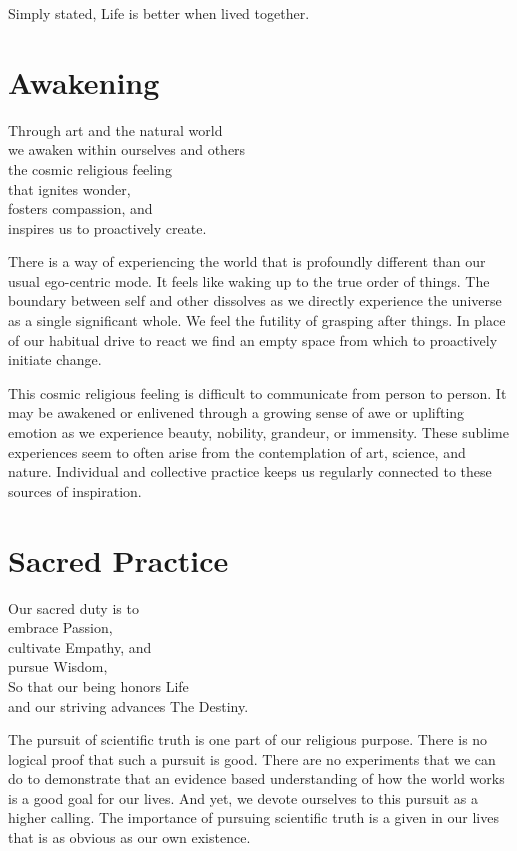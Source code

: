 \documentclass[ebook,12pt,openany,twoside]{memoir}
\newcommand{\tab}{\hspace*{2em}}
\newcommand{\imagefacingchapter}[1]{
  \cleartoverso
  \clearpage \null
  \thispagestyle{cleared}
  \AddToShipoutPictureBG*{%
    \AtStockLowerLeft{%
      \texttt{[image: \#1]}
    }
  }
  \clearpage
}
\begin{document}
Simply stated, Life is better when lived together.



\imagefacingchapter{images/Awakening}
\chapter{Awakening}
\setlength\epigraphwidth{3.0in}
\epigraph{
  Through art and the natural world\\
  we awaken within ourselves and others\\
  \tab the cosmic religious feeling\\
  \tab that ignites wonder,\\
  \tab fosters compassion, and\\
  \tab inspires us to proactively create.
}{}

There is a way of experiencing the world that is profoundly different than our
usual ego-centric mode. It feels like waking up to the true order of things.
The boundary between self and other dissolves as we directly experience the
universe as a single significant whole. We feel the futility of grasping after
things. In place of our habitual drive to react we find an empty space from
which to proactively initiate change.

This cosmic religious feeling is difficult to communicate from person to
person. It may be awakened or enlivened through a growing sense of awe or
uplifting emotion as we experience beauty, nobility, grandeur, or immensity.
These sublime experiences seem to often arise from the contemplation of art,
science, and nature. Individual and collective practice keeps us regularly
connected to these sources of inspiration.





\imagefacingchapter{images/SacredPractice}
\chapter{Sacred Practice}
\setlength\epigraphwidth{3.0in}
\epigraph{
  Our sacred duty is to\\
  embrace Passion,\\
  cultivate Empathy, and\\
  pursue Wisdom,\\
  \tab So that our being honors Life\\
  \tab and our striving advances The Destiny.
}{}

\noindent The pursuit of scientific truth is one part of our religious purpose.
There is no logical proof that such a pursuit is good. There are no experiments
that we can do to demonstrate that an evidence based understanding of how the
world works is a good goal for our lives. And yet, we devote ourselves to this
pursuit as a higher calling. The importance of pursuing scientific truth is a
given in our lives that is as obvious as our own existence.
\end{document}

